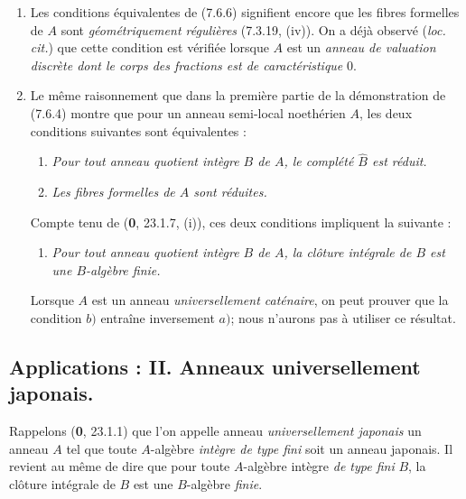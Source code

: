 \begin{remarks}[7.6.7]
\label{IV.2.s7.6.7-fr}
\begin{enumerate}
\item[(i)] Les conditions équivalentes de (7.6.6) signifient encore que
les fibres formelles de $A$ sont \emph{géométriquement régulières} (7.3.19, (iv)). On
a déjà observé (\emph{loc. cit.}) que cette condition est vérifiée lorsque $A$
est un \emph{anneau de valuation discrète dont le corps des fractions est de
caractéristique} 0.

\item[(ii)] Le même raisonnement que dans la première partie de la
démonstration de (7.6.4) montre que pour un anneau semi-local noethérien $A$,
les deux conditions suivantes sont équivalentes :
\begin{enumerate}
\item[a)] \emph{Pour tout anneau quotient intègre $B$ de $A$, le complété
$\widehat B$ est réduit.}
\item[a$'$)] \emph{Les fibres formelles de $A$ sont réduites.}
\end{enumerate}

Compte tenu de (\textbf{0}, 23.1.7, (i)), ces deux conditions impliquent la suivante :
\begin{enumerate}
\item[b)] \emph{Pour tout anneau quotient intègre $B$ de $A$, la clôture
intégrale de $B$ est une $B$-algèbre finie.}
\end{enumerate}

Lorsque $A$ est un anneau \emph{universellement caténaire}, on peut prouver que la
condition $b)$ entraîne inversement $a)$; nous n'aurons pas à utiliser ce
résultat.
\end{enumerate}
\end{remarks}

\subsection{Applications : II. Anneaux universellement japonais.}
\label{IV.2.ss7.7-fr}

\begin{env}[7.7.1]
\label{IV.2.s7.7.1-fr}
Rappelons (\textbf{0}, 23.1.1) que l'on appelle anneau \emph{universellement japonais} un
anneau $A$ tel que toute $A$-algèbre \emph{intègre de type fini} soit un anneau
japonais. Il revient au même de dire que pour toute $A$-algèbre intègre \emph{de type
fini} $B$, la clôture intégrale de $B$ est une $B$-algèbre \emph{finie}.
\end{env}

